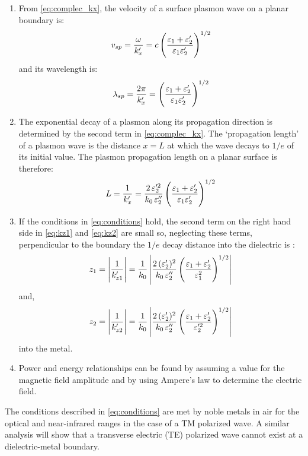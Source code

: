\documentclass[11pt]{article}
\begin{document}
\begin{enumerate}
  \item	From \eqref{eq:complec_kx}, the velocity of a surface plasmon wave on a planar boundary is:
  \begin{equation}
    v_{sp} = \frac{\omega}{k_x'} = c \left( \frac{\varepsilon_1 + \varepsilon_2'}{\varepsilon_1 \varepsilon_2'} \right)^{1/2}
    \label{eq:velocity}
  \end{equation}
  and its wavelength is:
  \begin{equation}
    \lambda_{sp} = \frac{2 \pi}{k_x'} = \left( \frac{\varepsilon_1 + \varepsilon_2'}{\varepsilon_1 \varepsilon_2'} \right)^{1/2}
    \label{eq:wavelength}
  \end{equation}
  \item	The exponential decay of a plasmon along its propagation direction is determined by the second term in \eqref{eq:complec_kx}. The `propagation length' of a plasmon wave is the distance $x = L$ at which the wave decays to   $1/e$ of its initial value. The plasmon propagation length on a planar surface is therefore:
  \begin{equation}
    L = \frac{1}{k_x'} = \frac{2 \,\varepsilon_2'^2}{k_0 \,\varepsilon_2''} \left( \frac{\varepsilon_1 + \varepsilon_2'}{\varepsilon_1 \varepsilon_2'} \right)^{1/2}
    \label{eq:plength}
  \end{equation}
  \item	If the conditions in \eqref{eq:conditions} hold, the second term on the right hand side in \eqref{eq:kz1} and \eqref{eq:kz2} are small so, neglecting these terms, perpendicular to the boundary the $1/e$ decay distance into the dielectric is \cite{Raether1988}:
  \begin{equation}
    z_1 = \left| \frac{1}{k_{z1}'} \right| = \frac{1}{k_0} \left| \frac{2 \, (\varepsilon_2')^2}{k_0 \,\varepsilon_2''} \left( \frac{\varepsilon_1 + \varepsilon_2'}{\varepsilon_1^2} \right)^{1/2} \right|
    \label{eq:decay_dielectric}
  \end{equation}
  and,
  \begin{equation}
    z_2 = \left| \frac{1}{k_{z2}'} \right| = \frac{1}{k_0} \left| \frac{2 \, (\varepsilon_2')^2}{k_0 \,\varepsilon_2''} \left( \frac{\varepsilon_1 + \varepsilon_2'}{\varepsilon_2'^2} \right)^{1/2} \right|
    \label{eq:decay_metal}
  \end{equation}
  into the metal.
  \item	Power and energy relationships can be found by assuming a value for the magnetic field amplitude and by using Ampere's law to determine the electric field.
\end{enumerate}
%
The conditions described in \eqref{eq:conditions} are met by noble metals in air for the optical and near-infrared ranges in the case of a TM polarized wave. A similar analysis will show that a transverse electric (TE) polarized wave cannot exist at a dielectric-metal boundary.
\end{document}
